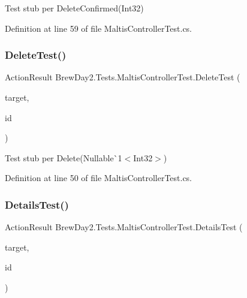 Test stub per Delete\+Confirmed(\+Int32)



Definition at line 59 of file Maltis\+Controller\+Test.\+cs.

\mbox{\label{class_brew_day2_1_1_tests_1_1_maltis_controller_test_a46fb89f9f2b7a6205530159c7361fc53}} 
\subsubsection{\texorpdfstring{Delete\+Test()}{DeleteTest()}}
{\footnotesize\ttfamily Action\+Result Brew\+Day2.\+Tests.\+Maltis\+Controller\+Test.\+Delete\+Test (\begin{DoxyParamCaption}\item[{\mbox{[}\+Pex\+Assume\+Under\+Test\mbox{]} \mbox{\hyperlink{class_brew_day2_1_1_controllers_1_1_maltis_controller}{Maltis\+Controller}}}]{target,  }\item[{int?}]{id }\end{DoxyParamCaption})}



Test stub per Delete(Nullable\`{}1$<$Int32$>$)



Definition at line 50 of file Maltis\+Controller\+Test.\+cs.

\mbox{\label{class_brew_day2_1_1_tests_1_1_maltis_controller_test_a875344b19b83444d97ba00702bc999e6}} 
\subsubsection{\texorpdfstring{Details\+Test()}{DetailsTest()}}
{\footnotesize\ttfamily Action\+Result Brew\+Day2.\+Tests.\+Maltis\+Controller\+Test.\+Details\+Test (\begin{DoxyParamCaption}\item[{\mbox{[}\+Pex\+Assume\+Under\+Test\mbox{]} \mbox{\hyperlink{class_brew_day2_1_1_controllers_1_1_maltis_controller}{Maltis\+Controller}}}]{target,  }\item[{int?}]{id }\end{DoxyParamCaption})}



